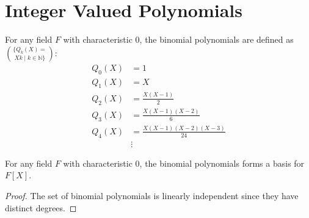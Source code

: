 \section{Integer Valued Polynomials}
\label{sec:integer_valued_polynomial}

\begin{definition}
    \label{def:binomial_polynomial}
    For any field $F$ with characteristic $0$, the binomial polynomials are defined as
    $\{ Q_k(X) = \choose X k \mid k \in \mathbb{N} \}$:
    \begin{equation}
        \begin{aligned}
            Q_0(X) &= 1 \\
            Q_1(X) &= X \\
            Q_2(X) &= \frac{X(X-1)}{2} \\
            Q_3(X) &= \frac{X(X-1)(X-2)}{6} \\
            Q_4(X) &= \frac{X(X-1)(X-2)(X-3)}{24} \\
            &\vdots
        \end{aligned}
    \end{equation}
\end{definition}

\begin{lemma}
    For any field $F$ with characteristic $0$, the binomial polynomials forms a basis for $F[X]$.
    \leanok
\end{lemma}
\begin{proof}
    The set of binomial polynomials is linearly independent since they have distinct degrees.
\end{proof}